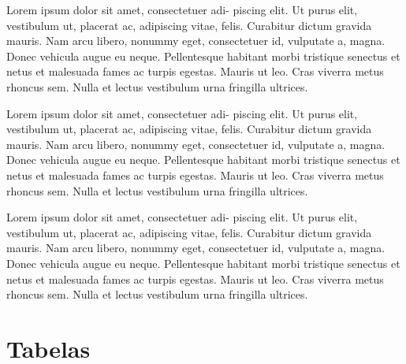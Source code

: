 \begin{question}[type={exam}]{2}
Lorem ipsum dolor sit amet, consectetuer adi-
piscing elit. Ut purus elit, vestibulum ut, placerat ac, adipiscing vitae,
felis. Curabitur dictum gravida mauris. Nam arcu libero, nonummy
eget, consectetuer id, vulputate a, magna. Donec vehicula augue
eu neque. Pellentesque habitant morbi tristique senectus et netus
et malesuada fames ac turpis egestas. Mauris ut leo. Cras viverra
metus rhoncus sem. Nulla et lectus vestibulum urna fringilla ultrices.
\end{question}

\begin{question}[type={exam}]{2}
Lorem ipsum dolor sit amet, consectetuer adi-
piscing elit. Ut purus elit, vestibulum ut, placerat ac, adipiscing vitae,
felis. Curabitur dictum gravida mauris. Nam arcu libero, nonummy
eget, consectetuer id, vulputate a, magna. Donec vehicula augue
eu neque. Pellentesque habitant morbi tristique senectus et netus
et malesuada fames ac turpis egestas. Mauris ut leo. Cras viverra
metus rhoncus sem. Nulla et lectus vestibulum urna fringilla ultrices.
\end{question}

\begin{question}[type={exam}]{2}
Lorem ipsum dolor sit amet, consectetuer adi-
piscing elit. Ut purus elit, vestibulum ut, placerat ac, adipiscing vitae,
felis. Curabitur dictum gravida mauris. Nam arcu libero, nonummy
eget, consectetuer id, vulputate a, magna. Donec vehicula augue
eu neque. Pellentesque habitant morbi tristique senectus et netus
et malesuada fames ac turpis egestas. Mauris ut leo. Cras viverra
metus rhoncus sem. Nulla et lectus vestibulum urna fringilla ultrices.
\end{question}
\vfill
\pagebreak
\section{Tabelas}

